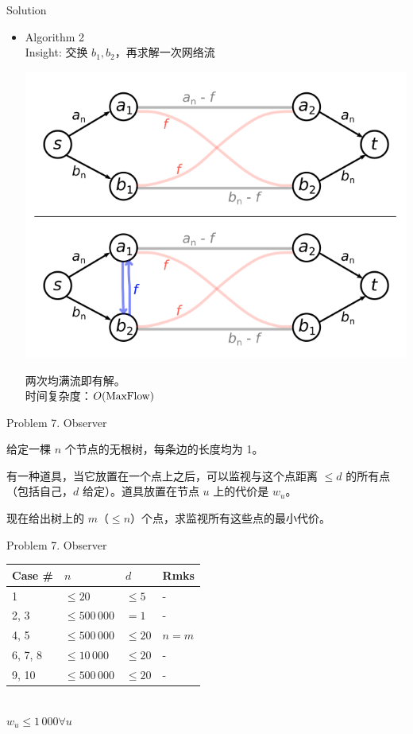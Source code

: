 \documentclass[UTF8]{beamer}
\begin{document}
\begin{frame}{Solution}

\begin{itemize}
    \item Algorithm 2 \\
        Insight: 交换 $b_1, b_2$，再求解一次网络流

        \includegraphics[scale=0.2]{bridge-secondflow.png}

        \pause
        两次均满流即有解。\\
        时间复杂度：$O({\rm MaxFlow})$
\end{itemize}

\end{frame}


\begin{frame}{Problem 7. Observer}

给定一棵 $n$ 个节点的无根树，每条边的长度均为 1。

有一种道具，当它放置在一个点上之后，可以监视与这个点距离 $\leq d$ 的所有点
（包括自己，$d$ 给定）。道具放置在节点 $u$ 上的代价是 $w_u$。

现在给出树上的 $m$（$ \leq n$）个点，求监视所有这些点的最小代价。

\end{frame}

\begin{frame}{Problem 7. Observer}

\begin{tabularx}{\textwidth}{X|X|X|X} \hline
Case \# & $n$ & $d$ & Rmks \\ \hline \hline
1       & $\leq 20$       & $\leq 5$  & - \\ \hline
2, 3    & $\leq 500\,000$ & $= 1$     & - \\ \hline
4, 5    & $\leq 500\,000$ & $\leq 20$ & $n = m$ \\ \hline
6, 7, 8 & $\leq 10\,000$  & $\leq 20$ & - \\ \hline
9, 10   & $\leq 500\,000$ & $\leq 20$ & - \\ \hline
\end{tabularx}
\\
$w_u \leq 1\,000 \forall u$

\end{frame}
\end{document}
